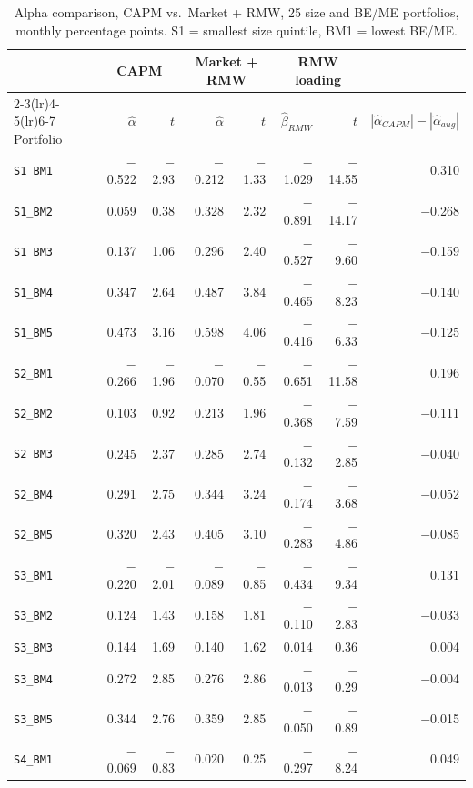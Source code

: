 \documentclass[11pt]{article}
\begin{document}
\begin{table}[H]
\centering
\caption{Alpha comparison, CAPM vs.\ Market + RMW, 25 size and BE/ME
portfolios, monthly percentage points. S1 = smallest size quintile, BM1 =
lowest BE/ME.}
\footnotesize
\setlength{\tabcolsep}{4pt}
\begin{tabular}{lrrrrrrr}
\toprule
& \multicolumn{2}{c}{CAPM} & \multicolumn{2}{c}{Market + RMW} & \multicolumn{2}{c}{RMW loading} & \\
\cmidrule(lr){2-3}\cmidrule(lr){4-5}\cmidrule(lr){6-7}
Portfolio & $\hat\alpha$ & $t$ & $\hat\alpha$ & $t$ & $\hat\beta_{RMW}$ & $t$ & $|\hat\alpha_{CAPM}| - |\hat\alpha_{aug}|$ \\
\midrule
\texttt{S1\_BM1} & $-$0.522 & $-$2.93 & $-$0.212 & $-$1.33 & $-$1.029 & $-$14.55 & 0.310 \\
\texttt{S1\_BM2} & 0.059 & 0.38 & 0.328 & 2.32 & $-$0.891 & $-$14.17 & $-$0.268 \\
\texttt{S1\_BM3} & 0.137 & 1.06 & 0.296 & 2.40 & $-$0.527 & $-$9.60 & $-$0.159 \\
\texttt{S1\_BM4} & 0.347 & 2.64 & 0.487 & 3.84 & $-$0.465 & $-$8.23 & $-$0.140 \\
\texttt{S1\_BM5} & 0.473 & 3.16 & 0.598 & 4.06 & $-$0.416 & $-$6.33 & $-$0.125 \\
\texttt{S2\_BM1} & $-$0.266 & $-$1.96 & $-$0.070 & $-$0.55 & $-$0.651 & $-$11.58 & 0.196 \\
\texttt{S2\_BM2} & 0.103 & 0.92 & 0.213 & 1.96 & $-$0.368 & $-$7.59 & $-$0.111 \\
\texttt{S2\_BM3} & 0.245 & 2.37 & 0.285 & 2.74 & $-$0.132 & $-$2.85 & $-$0.040 \\
\texttt{S2\_BM4} & 0.291 & 2.75 & 0.344 & 3.24 & $-$0.174 & $-$3.68 & $-$0.052 \\
\texttt{S2\_BM5} & 0.320 & 2.43 & 0.405 & 3.10 & $-$0.283 & $-$4.86 & $-$0.085 \\
\texttt{S3\_BM1} & $-$0.220 & $-$2.01 & $-$0.089 & $-$0.85 & $-$0.434 & $-$9.34 & 0.131 \\
\texttt{S3\_BM2} & 0.124 & 1.43 & 0.158 & 1.81 & $-$0.110 & $-$2.83 & $-$0.033 \\
\texttt{S3\_BM3} & 0.144 & 1.69 & 0.140 & 1.62 & 0.014 & 0.36 & 0.004 \\
\texttt{S3\_BM4} & 0.272 & 2.85 & 0.276 & 2.86 & $-$0.013 & $-$0.29 & $-$0.004 \\
\texttt{S3\_BM5} & 0.344 & 2.76 & 0.359 & 2.85 & $-$0.050 & $-$0.89 & $-$0.015 \\
\texttt{S4\_BM1} & $-$0.069 & $-$0.83 & 0.020 & 0.25 & $-$0.297 & $-$8.24 & 0.049 \\

\end{tabular}
\end{table}
\end{document}

